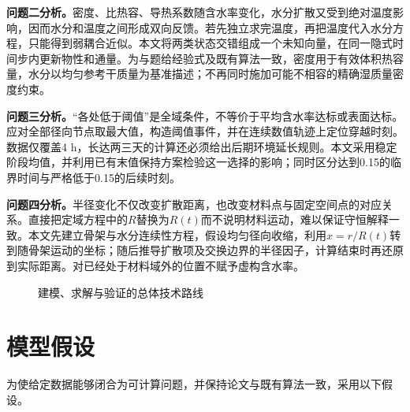 \textbf{问题二分析。}密度、比热容、导热系数随含水率变化，水分扩散又受到绝对温度影响，因而水分和温度之间形成双向反馈。若先独立求完温度，再把温度代入水分方程，只能得到弱耦合近似。本文将两类状态交错组成一个未知向量，在同一隐式时间步内更新物性和通量。为与题给经验式及既有算法一致，密度用于有效体积热容量，水分以均匀参考干质量为基准描述；不再同时施加可能不相容的精确湿质量密度约束。

\textbf{问题三分析。}“各处低于阈值”是全域条件，不等价于平均含水率达标或表面达标。应对全部径向节点取最大值，构造阈值事件，并在连续数值轨迹上定位穿越时刻。数据仅覆盖4 h，长达两三天的计算还必须给出后期环境延长规则。本文采用稳定阶段均值，并利用已有末值保持方案检验这一选择的影响；同时区分达到0.15的临界时间与严格低于0.15的后续时刻。

\textbf{问题四分析。}半径变化不仅改变扩散距离，也改变材料点与固定空间点的对应关系。直接把定域方程中的$R$替换为$R(t)$而不说明材料运动，难以保证守恒解释一致。本文先建立骨架与水分连续性方程，假设均匀径向收缩，利用$x=r/R(t)$转到随骨架运动的坐标；随后推导扩散项及交换边界的半径因子，计算结束时再还原到实际距离。对已经处于材料域外的位置不赋予虚构含水率。

\begin{figure}[H]\centering
{}
\caption{建模、求解与验证的总体技术路线}\label{fig:roadmap}
\end{figure}

\nextpage
\section{模型假设}
为使给定数据能够闭合为可计算问题，并保持论文与既有算法一致，采用以下假设。

